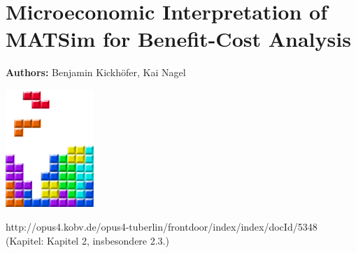 \chapter{Microeconomic Interpretation of MATSim for Benefit-Cost Analysis }
\label{ch:economicEval}

\hfill \textbf{Authors:} Benjamin Kickhöfer, Kai Nagel

\begin{center} \includegraphics[width=0.25\textwidth, angle=0]{figures/MATSimBook.png} \end{center}


\citet[][]{NagelEtAl_JBNATSTAT_2008, RieserEtAl_TechRep_IVT_2007}

\citet[][]{Kickhoefer_PhDThesis_2014}
http://opus4.kobv.de/opus4-tuberlin/frontdoor/index/index/docId/5348  (Kapitel: Kapitel 2, insbesondere 2.3.) 

